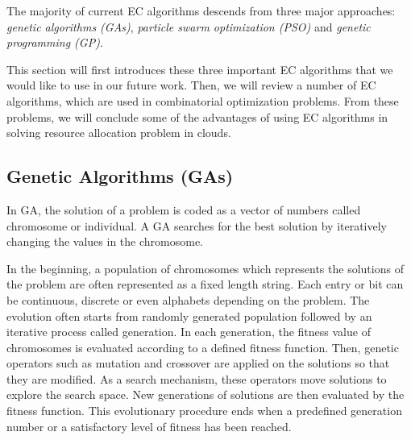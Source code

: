  The majority of current EC algorithms descends from three major approaches: \emph{genetic algorithms (GAs)}, \emph{particle swarm optimization (PSO)} and \emph{genetic programming (GP)}. 


This section will first introduces these three important EC algorithms that we would like to use in our future work. Then, we will review a number of EC algorithms, which are used in combinatorial optimization problems. From these problems, we will conclude some of the advantages of using EC algorithms in solving resource allocation problem in clouds.

\subsection{Genetic Algorithms (GAs)}
 In GA, the solution of a problem is coded as a vector of numbers called chromosome or individual. A GA searches for the best solution by iteratively changing the values in the chromosome. 

 In the beginning, a population of chromosomes which represents the solutions of the problem are often represented as a fixed length string. Each entry or bit can be continuous, discrete or even alphabets depending on the problem.  The evolution often starts from randomly generated population followed by an iterative process called generation.  In each generation, the fitness value of chromosomes is evaluated according to a defined fitness function.  Then, genetic operators such as mutation and crossover are applied on the solutions so that they are modified. As a search mechanism, these operators move solutions to explore the search space. New generations of solutions are then evaluated by the fitness function.  This evolutionary procedure ends when a predefined generation number or a satisfactory level of fitness has been reached.

